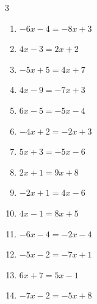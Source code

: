 \begin{multicols}{3}
\begin{enumerate}
  \item $-6x-4=-8x+3$


  \item $4x-3=2x+2$


  \item $-5x+5=4x+7$


  \item $4x-9=-7x+3$


  \item $6x-5=-5x-4$


  \item $-4x+2=-2x+3$


  \item $5x+3=-5x-6$


  \item $2x+1=9x+8$

        \phantom{$\displaystyle x=-1$}

\columnbreak %

  \item $-2x+1=4x-6$


  \item $4x-1=8x+5$


  \item $-6x-4=-2x-4$

        \phantom{$\displaystyle x=0$}

  \item $-5x-2=-7x+1$


  \item $6x+7=5x-1$

        \phantom{$\displaystyle x=-8$}

  \item $-7x-2=-5x+8$


\end{enumerate}
\end{multicols}

